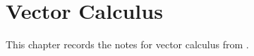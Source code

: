 \chapter{Vector Calculus}
This chapter records the notes for vector calculus from \citet{matthews1998vector}.

